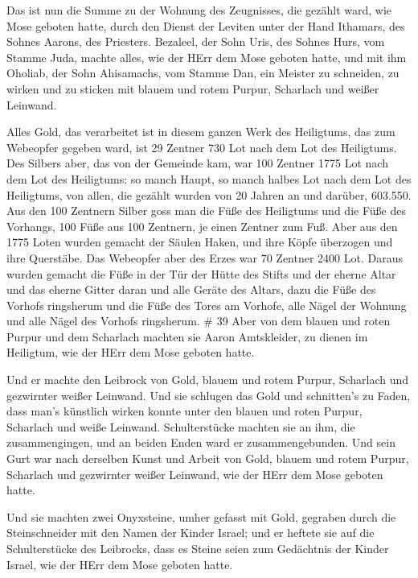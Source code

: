  Das ist nun die Summe zu der Wohnung des Zeugnisses, die
gezählt ward, wie Mose geboten hatte, durch den Dienst der Leviten unter
der Hand Ithamars, des Sohnes Aarons, des Priesters. 
Bezaleel, der Sohn Uris, des Sohnes Hurs, vom Stamme Juda, machte alles,
wie der HErr dem Mose geboten hatte,  und mit ihm Oholiab,
der Sohn Ahisamachs, vom Stamme Dan, ein Meister zu schneiden, zu wirken
und zu sticken mit blauem und rotem Purpur, Scharlach und weißer
Leinwand.

 Alles Gold, das verarbeitet ist in diesem ganzen Werk des
Heiligtums, das zum Webeopfer gegeben ward, ist 29 Zentner 730 Lot nach
dem Lot des Heiligtums.  Des Silbers aber, das von der
Gemeinde kam, war 100 Zentner 1775 Lot nach dem Lot des Heiligtums:
 so manch Haupt, so manch halbes Lot nach dem Lot des
Heiligtums, von allen, die gezählt wurden von 20 Jahren an und darüber,
603.550.  Aus den 100 Zentnern Silber goss man die Füße des
Heiligtums und die Füße des Vorhangs, 100 Füße aus 100 Zentnern, je
einen Zentner zum Fuß.  Aber aus den 1775 Loten wurden
gemacht der Säulen Haken, und ihre Köpfe überzogen und ihre Querstäbe.
 Das Webeopfer aber des Erzes war 70 Zentner 2400 Lot.
 Daraus wurden gemacht die Füße in der Tür der Hütte des
Stifts und der eherne Altar und das eherne Gitter daran und alle Geräte
des Altars,  dazu die Füße des Vorhofs ringsherum und die
Füße des Tores am Vorhofe, alle Nägel der Wohnung und alle Nägel des
Vorhofs ringsherum. \# 39  Aber von dem blauen und roten
Purpur und dem Scharlach machten sie Aaron Amtskleider, zu dienen im
Heiligtum, wie der HErr dem Mose geboten hatte.

 Und er machte den Leibrock von Gold, blauem und rotem
Purpur, Scharlach und gezwirnter weißer Leinwand.  Und sie
schlugen das Gold und schnitten's zu Faden, dass man's künstlich wirken
konnte unter den blauen und roten Purpur, Scharlach und weiße Leinwand.
 Schulterstücke machten sie an ihm, die zusammengingen, und
an beiden Enden ward er zusammengebunden.  Und sein Gurt war
nach derselben Kunst und Arbeit von Gold, blauem und rotem Purpur,
Scharlach und gezwirnter weißer Leinwand, wie der HErr dem Mose geboten
hatte.

 Und sie machten zwei Onyxsteine, umher gefasst mit Gold,
gegraben durch die Steinschneider mit den Namen der Kinder Israel;
 und er heftete sie auf die Schulterstücke des Leibrocks,
dass es Steine seien zum Gedächtnis der Kinder Israel, wie der HErr dem
Mose geboten hatte.

